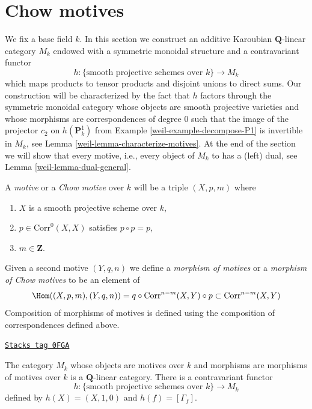 \section{Chow motives}
\label{weil-section-chow-motives}
We fix a base field $k$. In this section we construct an additive
Karoubian $\mathbf{Q}$-linear category $M_k$ endowed
with a symmetric monoidal structure and a contravariant functor
$$
h : \{\text{smooth projective schemes over }k\} \longrightarrow M_k
$$
which maps products to tensor products and disjoint unions to direct sums.
Our construction will be characterized by the fact that $h$ factors through
the symmetric monoidal category whose objects are smooth projective varieties
and whose morphisms are correspondences of degree $0$ such that
the image of the projector $c_2$ on $h(\mathbf{P}^1_k)$ from
Example \ref{weil-example-decompose-P1} is invertible in $M_k$, see
Lemma \ref{weil-lemma-characterize-motives}.
At the end of the section we will show that every motive, i.e.,
every object of $M_k$ to has a (left) dual, see Lemma \ref{weil-lemma-dual-general}.

\medskip\noindent
A {\it motive} or a {\it Chow motive} over $k$ will be a triple
$(X, p, m)$ where
\begin{enumerate}
\item $X$ is a smooth projective scheme over $k$,
\item $p \in \text{Corr}^0(X, X)$ satisfies $p \circ p = p$,
\item $m \in \mathbf{Z}$.
\end{enumerate}
Given a second motive $(Y, q, n)$ we define a
{\it morphism of motives} or a {\it morphism of Chow motives}
to be an element of
$$
\Hom((X, p, m), (Y, q, n)) =
q \circ \text{Corr}^{n - m}(X, Y) \circ p \subset \text{Corr}^{n - m}(X, Y)
$$
Composition of morphisms of motives is defined using the composition of
correspondences defined above.

\begin{lemma}[Motives]
\label{weil-lemma-motives}
\href{https://stacks.math.columbia.edu/tag/0FGA}{\texttt{Stacks tag 0FGA}}

The category $M_k$ whose objects are motives over $k$ and morphisms
are morphisms of motives over $k$ is a $\mathbf{Q}$-linear category.
There is a contravariant functor
$$
h : \{\text{smooth projective schemes over }k\} \longrightarrow M_k
$$
defined by $h(X) = (X, 1, 0)$ and $h(f) = [\Gamma_f]$.
\end{lemma}

